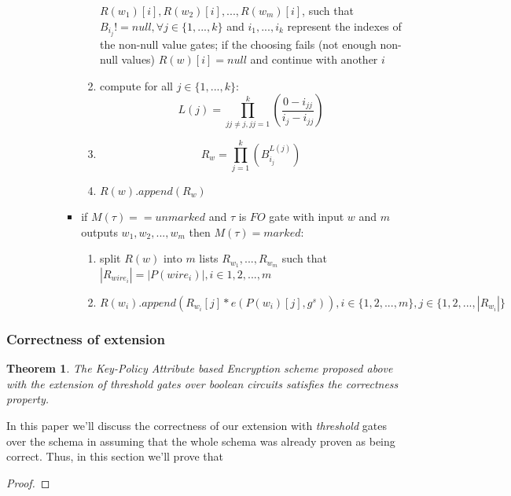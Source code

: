 \documentclass[12pt]{article}
\newtheorem{theorem}{Theorem}
\begin{document}
\begin{enumerate}
\begin{itemize}
\begin{itemize}
\begin{itemize}
\begin{enumerate}
				        $R(w_1)[i], R(w_2)[i], ..., R(w_m)[i]$, such that $B_{i_j} != null, \forall j \in \{1, ..., k\}$ and $i_1, ..., i_k$ represent the indexes of the non-null value gates; if the choosing fails (not enough non-null values) $R(w)[i] = null$ and continue with another $i$
				        \item compute for all $j \in \{1, ..., k\}$: $$L(j) = \prod_{jj \neq j, jj = 1}^{k}(\frac{0 - i_{jj}}{i_j - i_{jj}})$$ 
				        \item $$R_w = \prod_{j = 1}^{k} (B_{i_j} ^{L(j)})$$
				        \item $R(w).append(R_w)$
				    \end{enumerate}
				    \item if $M(\tau) == unmarked$ and $\tau$ is $FO$ gate with input $w$ and $m$ outputs $w_1, w_2, ..., w_m$ then $M(\tau) = marked$:
				    \begin{enumerate}
				        \item split $R(w)$ into  $m$ lists $R_{w_1}, ...,R_{w_m}$ such that $|R_{wire_i}| = |P(wire_i)|, i \in {1, 2, ..., m}$
				        \item $R(w_i).append(R_{w_i}[j] * e(P(w_i)[j], g^s)), i \in \{1, 2, ..., m\}, j \in \{1, 2, ...,|R_{w_i}|\}$ 
				    \end{enumerate}
				\end{itemize}
			\end{itemize}
		\end{itemize}
\end{enumerate}

\subsubsection{Correctness of extension}

\begin{theorem}
The \textit{Key-Policy Attribute based Encryption} scheme proposed above with the extension of threshold gates over boolean circuits satisfies the correctness property.
\end{theorem}

In this paper we'll discuss the correctness of our extension with \textit{threshold} gates over the schema in \cite{fltccd} assuming that the whole schema was already proven as being correct. Thus, in this section we'll prove that  

\begin{proof}



\end{proof}
\end{document}

